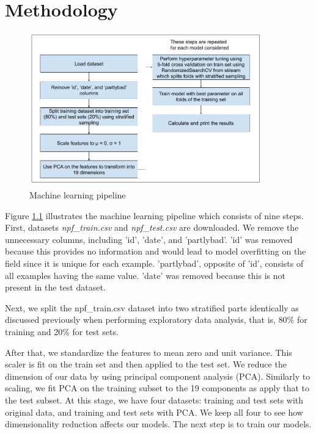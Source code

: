 \chapter{Methodology}

\begin{figure}
   \centering
   \includegraphics[width=0.9\textwidth]{images/pipeline.png}
   \caption{Machine learning pipeline}
   \label{fig:pipeline}
\end{figure}

Figure \ref{fig:pipeline} illustrates the machine learning pipeline which consists of nine steps. First, datasets \textit{npf\_train.csv} and \textit{npf\_test.csv} are downloaded. We remove the unnecessary columns, including 'id', 'date', and 'partlybad'. 'id' was removed because this provides no information and would lead to model overfitting on the field since it is unique for each example. 'partlybad', opposite of 'id', consists of all examples having the same value. 'date' was removed because this is not present in the test dataset.

Next, we split the npf\_train.csv dataset into two stratified parts identically as discussed previously when performing exploratory data analysis, that is, 80\% for training and 20\% for test sets.

After that, we standardize the features to mean zero and unit variance. This scaler is fit on the train set and then applied to the test set. We reduce the dimension of our data by using principal component analysis (PCA). Similarly to scaling, we fit PCA on the training subset to the 19 components as apply that to the test subset. At this stage, we have four datasets: training and test sets with original data, and training and test sets with PCA. We keep all four to see how dimensionality reduction affects our models. The next step is to train our models.

